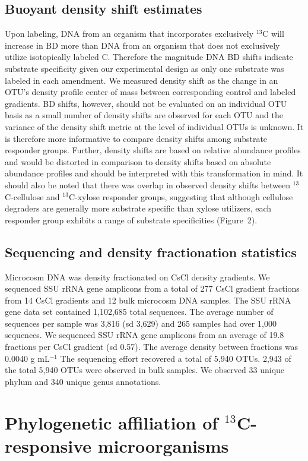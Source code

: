 \documentclass{article}
\begin{document}
\subsection{Buoyant density shift estimates}\label{BD}
Upon labeling, DNA from an organism that incorporates exclusively $^{13}$C will
increase in BD more than DNA from an organism that does not exclusively utilize
isotopically labeled C. Therefore the magnitude DNA BD shifts indicate
substrate specificity given our experimental design as only one substrate was
labeled in each amendment. We measured density shift as the change in an OTU's
density profile center of mass between corresponding control and labeled
gradients. BD shifts, however, should not be evaluated on an individual OTU
basis as a small number of density shifts are observed for each OTU and the
variance of the density shift metric at the level of individual OTUs is
unknown. It is therefore more informative to compare density shifts among
substrate responder groups. Further, density shifts are based on relative
abundance profiles and would be distorted in comparison to density shifts based
on absolute abundance profiles and should be interpreted with this
transformation in mind. It should also be noted that there was overlap in
observed density shifts between $^{13}$C-cellulose and $^{13}$C-xylose
responder groups, suggesting that although cellulose degraders are generally
more substrate specific than xylose utilizers, each responder group exhibits
a range of substrate specificities (Figure~2). 

\subsection{Sequencing and density fractionation statistics}\label{seq_stats}
Microcosm DNA was density fractionated on CsCl density gradients. We sequenced
SSU rRNA gene amplicons from a total of 277 CsCl gradient fractions from 14
CsCl gradients and 12 bulk microcosm DNA samples. The SSU rRNA gene data set
contained 1,102,685 total sequences. The average number of sequences per sample
was 3,816 (sd 3,629) and 265 samples had over 1,000 sequences. We sequenced SSU
rRNA gene amplicons from an average of
19.8 fractions per CsCl gradient (sd 0.57). The average density between
fractions was  0.0040 g mL$^{-1}$ The sequencing effort recovered a total of
5,940 OTUs. 2,943 of the total 5,940 OTUs were observed in bulk samples. We
observed 33 unique phylum and 340 unique genus annotations.

\section{Phylogenetic affiliation of $^{13}$C-responsive microorganisms}
\end{document}
